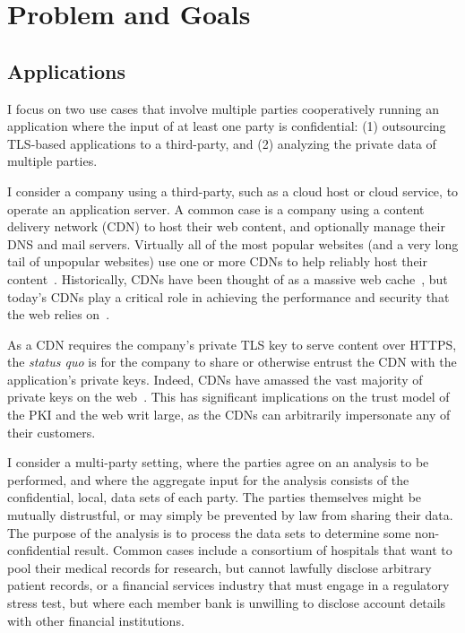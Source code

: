 \section{Problem and Goals}
\label{sec:background}

\subsection{Applications}

I focus on two use cases that involve multiple parties cooperatively running
an application where the input of at least one party is confidential:
(1) outsourcing TLS-based applications to a third-party, and (2)
analyzing the private data of multiple parties.


I consider a company using a third-party, such as a cloud host or cloud
service, to operate an application server.
%
A common case is a company using a content delivery network (CDN) to
host their web content, and optionally manage their DNS and mail servers.
%
Virtually all of the most popular websites (and a very long tail
of unpopular websites) use one or more CDNs to help reliably host
their content~\cite{key-sharing}. 
%
Historically, CDNs have been thought of as a massive web
cache~\cite{cdn-on-demand}, but today’s CDNs play a critical role in achieving
the performance and security that the web relies on~\cite{securing-cdns}.

As a CDN requires the company's private TLS key to serve content over HTTPS,
the \emph{status quo} is for the company to share or otherwise entrust the CDN
with the application's private keys.
%
Indeed, CDNs have amassed the vast majority of private keys on the
web~\cite{key-sharing,when-https-meets-cdn}.
%
This has significant implications on the trust model of the PKI and the web
writ large, as the CDNs  can arbitrarily impersonate any of their customers.


I consider a multi-party setting, where the parties agree on an analysis to be
performed, and where the aggregate input for the analysis consists of the
confidential, local, data sets of each party.
% 
The parties themselves might be mutually distrustful, or may simply be
prevented by law from sharing their data.
%
The purpose of the analysis is to process the data sets to determine some
non-confidential result.
%
Common cases include a consortium of hospitals that want to pool their medical
records for research, but cannot lawfully disclose arbitrary patient records,
or a financial services industry  that must engage in a regulatory stress test,
but where each member bank is unwilling to disclose account details
with other financial institutions.


